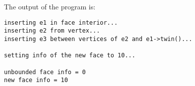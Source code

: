 
The output of the program is:

\begin{verbatim}
inserting e1 in face interior...
inserting e2 from vertex...
inserting e3 between vertices of e2 and e1->twin()...

setting info of the new face to 10...

unbounded face info = 0
new face info = 10
\end{verbatim}


